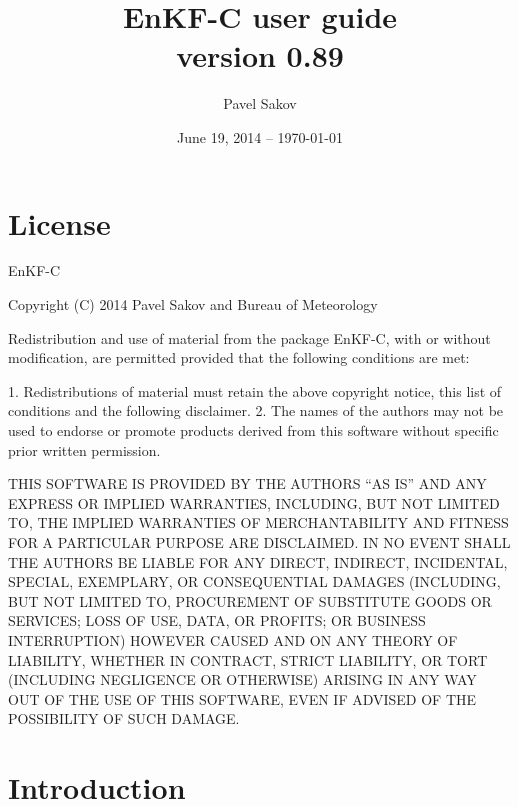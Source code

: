 \documentclass[11pt]{report}
\begin{document}
\title{EnKF-C user guide\\{\normalsize version 0.89}}

\author{Pavel Sakov}
\date{June 19, 2014 -- \today}

\maketitle
\thispagestyle{empty}

\clearpage

\tableofcontents

\clearpage

\chapter*{License}

EnKF-C

Copyright (C) 2014 Pavel Sakov and Bureau of Meteorology

Redistribution and use of material from the package EnKF-C, with or without
modification, are permitted provided that the following conditions are 
met:

   1. Redistributions of material must retain the above copyright notice, this
      list of conditions and the following disclaimer.
   2. The names of the authors may not be used to endorse or promote products
      derived from this software without specific prior written permission.

THIS SOFTWARE IS PROVIDED BY THE AUTHORS ``AS IS'' AND ANY EXPRESS OR IMPLIED 
WARRANTIES, INCLUDING, BUT NOT LIMITED TO, THE IMPLIED WARRANTIES OF
MERCHANTABILITY AND FITNESS FOR A PARTICULAR PURPOSE ARE DISCLAIMED. IN NO
EVENT SHALL THE AUTHORS BE LIABLE FOR ANY DIRECT, INDIRECT, INCIDENTAL, SPECIAL,
EXEMPLARY, OR CONSEQUENTIAL DAMAGES (INCLUDING, BUT NOT LIMITED TO, PROCUREMENT
OF SUBSTITUTE GOODS OR SERVICES; LOSS OF USE, DATA, OR PROFITS; OR BUSINESS
INTERRUPTION) HOWEVER CAUSED AND ON ANY THEORY OF LIABILITY, WHETHER IN
CONTRACT, STRICT LIABILITY, OR TORT (INCLUDING NEGLIGENCE OR OTHERWISE) ARISING
IN ANY WAY OUT OF THE USE OF THIS SOFTWARE, EVEN IF ADVISED OF THE POSSIBILITY
OF SUCH DAMAGE.

\chapter*{Introduction}
\end{document}
